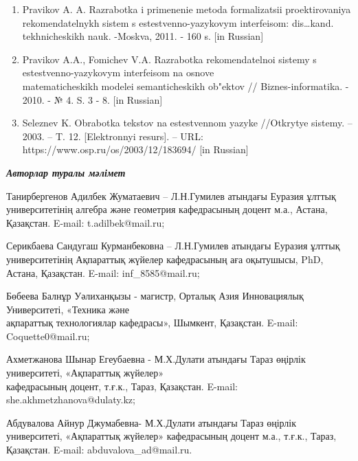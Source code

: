 \begin{noparindent}
\begin{enumerate}
\def\labelenumi{\arabic{enumi}.}
\setcounter{enumi}{14}
\item
  Pravikov A. A. Razrabotka i primenenie metoda formalizatsii
  proektirovaniya rekomendatel\textquotesingle nykh sistem s
  estestvenno-yazykovym interfeisom: dis\ldots kand. tekhnicheskikh
  nauk. -Moskva, 2011. - 160 s. {[}in Russian{]}
\item
  Pravikov A.A., Fomichev V.A. Razrabotka
  rekomendatel\textquotesingle noi sistemy s estestvenno-yazykovym
  interfeisom na osnove \\matematicheskikh modelei semanticheskikh
  ob"ektov // Biznes-informatika. - 2010. - № 4. S. 3 - 8. {[}in
  Russian{]}
\item
  Seleznev K. Obrabotka tekstov na estestvennom yazyke //Otkrytye
  sistemy. -- 2003. -- T. 12. {[}Elektronnyi resurs{]}. -- URL:
  https://www.osp.ru/os/2003/12/183694/ {[}in Russian{]}
\end{enumerate}

\end{noparindent}


\emph{{\bfseries Авторлар туралы мәлімет}}


\begin{noparindent}

Танирбергенов Адилбек Жуматаевич -- Л.Н.Гумилев атындағы Еуразия ұлттық
университетінің алгебра және геометрия кафедрасының доцент м.а., Астана,
Қазақстан. E-mail: t.adilbek@mail.ru;

Серикбаева Сандугаш Курманбековна -- Л.Н.Гумилев атындағы Еуразия ұлттық
университетінің Ақпараттық жүйелер кафедрасының аға оқытушысы, PhD,
Астана, Қазақстан. E-mail: inf\_8585@mail.ru;

Бөбеева Балнұр Уәлиханқызы - магистр, Орталық Азия Инновациялық
Университеті, «Техника және \\ақпараттық технологиялар кафедрасы»,
Шымкент, Қазақстан. E-mail: Coquette0@mail.ru;

Ахметжанова Шынар Егеубаевна - М.Х.Дулати атындағы Тараз өңірлік
университеті, «Ақпараттық жүйелер» \\кафедрасының доцент, т.ғ.к., Тараз,
Қазақстан. E-mail: she.akhmetzhanova@dulaty.kz;

Абдувалова Айнур Джумабевна- М.Х.Дулати атындағы Тараз өңірлік
университеті, «Ақпараттық жүйелер» кафедрасының доцент м.а., т.ғ.к.,
Тараз, Қазақстан. E-mail: abduvalova\_ad@mail.ru.

\end{noparindent}

